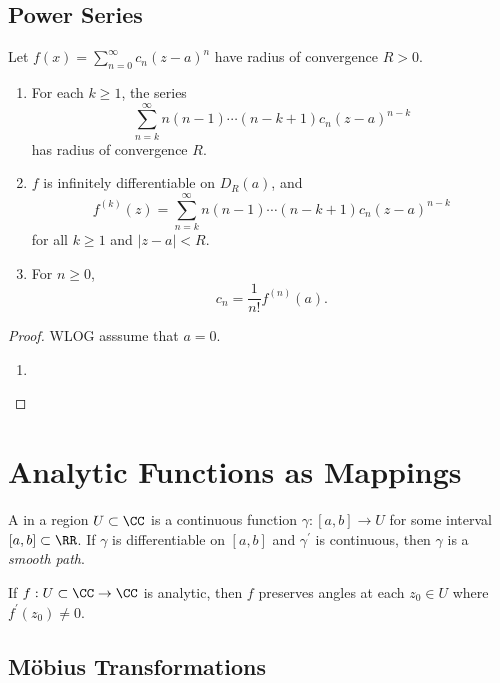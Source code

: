 \subsection{Power Series}
\begin{proposition}
Let $\displaystyle f(x)=\sum_{n=0}^{\infty}c_n(z-a)^n$ have radius of convergence $R>0$.
\begin{enumerate}[label=(\roman*)]
\item For each $k\ge1$, the series
\[\sum_{n=k}^{\infty}n(n-1)\cdots(n-k+1)c_n(z-a)^{n-k}\]
has radius of convergence $R$.
\item $f$ is infinitely differentiable on $D_R(a)$, and
\[f^{(k)}(z)=\sum_{n=k}^{\infty}n(n-1)\cdots(n-k+1)c_n(z-a)^{n-k}\]
for all $k\ge1$ and $|z-a|<R$.
\item For $n\ge0$,
\[c_n=\frac{1}{n!}f^{(n)}(a).\]
\end{enumerate}
\end{proposition}

\begin{proof}
WLOG asssume that $a=0$.
\begin{enumerate}[label=(\roman*)]
\item 
\end{enumerate}
\end{proof}
\pagebreak

\section{Analytic Functions as Mappings}
\begin{definition}
A  in a region $U\subset\CC$ is a continuous function $\gamma:[a,b]\to U$ for some interval $[a,b]\subset\RR$. If $\gamma$ is differentiable on $[a,b]$ and $\gamma^\prime$ is continuous, then $\gamma$ is a \emph{smooth path}.
\end{definition}



\begin{proposition}
If $f:U\subset\CC\to\CC$ is analytic, then $f$ preserves angles at each $z_0\in U$ where $f^\prime(z_0)\neq0$.
\end{proposition}

\subsection{M\"{o}bius Transformations}